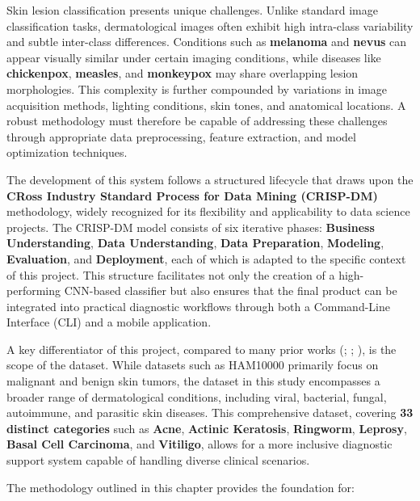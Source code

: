 \documentclass[
  12pt,
  oneside]{article}
\begin{document}
Skin lesion classification presents unique challenges. Unlike standard
image classification tasks, dermatological images often exhibit high
intra-class variability and subtle inter-class differences. Conditions
such as \textbf{melanoma} and \textbf{nevus} can appear visually similar
under certain imaging conditions, while diseases like
\textbf{chickenpox}, \textbf{measles}, and \textbf{monkeypox} may share
overlapping lesion morphologies. This complexity is further compounded
by variations in image acquisition methods, lighting conditions, skin
tones, and anatomical locations. A robust methodology must therefore be
capable of addressing these challenges through appropriate data
preprocessing, feature extraction, and model optimization techniques.

The development of this system follows a structured lifecycle that draws
upon the \textbf{CRoss Industry Standard Process for Data Mining
(CRISP-DM)} methodology, widely recognized for its flexibility and
applicability to data science projects. The CRISP-DM model consists of
six iterative phases: \textbf{Business Understanding}, \textbf{Data
Understanding}, \textbf{Data Preparation}, \textbf{Modeling},
\textbf{Evaluation}, and \textbf{Deployment}, each of which is adapted
to the specific context of this project. This structure facilitates not
only the creation of a high-performing CNN-based classifier but also
ensures that the final product can be integrated into practical
diagnostic workflows through both a Command-Line Interface (CLI) and a
mobile application.

A key differentiator of this project, compared to many prior works
(;
;
), is the scope of the
dataset. While datasets such as HAM10000 primarily focus on malignant
and benign skin tumors, the dataset in this study encompasses a broader
range of dermatological conditions, including viral, bacterial, fungal,
autoimmune, and parasitic skin diseases. This comprehensive dataset,
covering \textbf{33 distinct categories} such as \textbf{Acne},
\textbf{Actinic Keratosis}, \textbf{Ringworm}, \textbf{Leprosy},
\textbf{Basal Cell Carcinoma}, and \textbf{Vitiligo}, allows for a more
inclusive diagnostic support system capable of handling diverse clinical
scenarios.

The methodology outlined in this chapter provides the foundation for:
\end{document}

